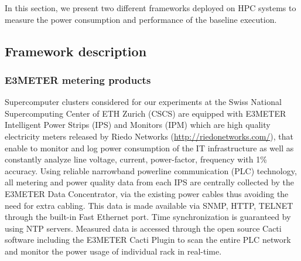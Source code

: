 In this section,  we present two different frameworks  deployed on HPC
systems  to  measure the  power  consumption  and  performance of  the
baseline execution. 

\subsection{Framework description}
\label{subsec:3.1}

\subsubsection{E3METER metering products}
Supercomputer  clusters considered  for our  experiments at  the Swiss
National Supercomputing Center of  ETH Zurich (CSCS) are equipped with
E3METER Intelligent  Power Strips (IPS)  and Monitors (IPM)  which are
high   quality   electricity  meters   released   by  Riedo   Networks
(\url{http://riedonetworks.com/}),  that  enable  to monitor  and  log
power  consumption of  the  IT infrastructure  as  well as  constantly
analyze  line  voltage,  current,  power-factor,  frequency  with  1\%
accuracy.   Using reliable  narrowband  powerline communication  (PLC)
technology,  all metering  and power  quality data  from each  IPS are
centrally collected by the E3METER Data Concentrator, via the existing
power cables thus  avoiding the need for extra  cabling.  This data is
made  available  via SNMP,  HTTP,  TELNET  through  the built-in  Fast
Ethernet  port.   Time  synchronization  is guaranteed  by  using  NTP
servers.   Measured data  is accessed  through the  open  source Cacti
software including  the E3METER  Cacti Plugin to  scan the  entire PLC
network and monitor the power usage of individual rack in real-time.

